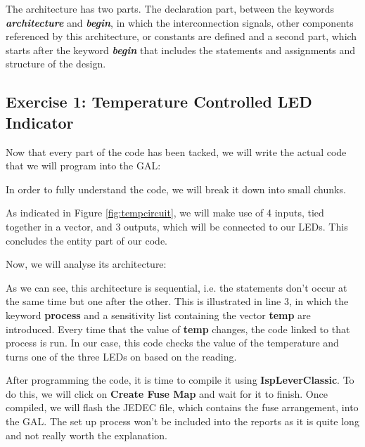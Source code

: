 The architecture has two parts. The declaration part, between the keywords \textbf{\textit{architecture}} and \textbf{\textit{begin}}, in which the interconnection signals, other components referenced by this architecture, or constants are defined and a second part, which starts after the keyword \textbf{\textit{begin}} that includes the statements and assignments and structure of the design.

\clearpage

\subsection{Exercise 1: Temperature Controlled LED Indicator}

Now that every part of the code has been tacked, we will write the actual code that we will program into the GAL:


\newpage

In order to fully understand the code, we will break it down into small chunks.


As indicated in Figure \ref{fig:tempcircuit}, we will make use of 4 inputs, tied together in a vector, and 3 outputs, which will be connected to our LEDs. This concludes the entity part of our code.

Now, we will analyse its architecture:


As we can see, this architecture is sequential, i.e. the statements don't occur at the same time but one after the other. This is illustrated in line 3, in which the keyword \textbf{process} and a sensitivity list containing the vector \textbf{temp} are introduced. Every time that the value of \textbf{temp} changes, the code linked to that process is run. In our case, this code checks the value of the temperature and turns one of the three LEDs on based on the reading.

\newpage

After programming the code, it is time to compile it using \textbf{IspLeverClassic}. To do this, we will click on \textbf{Create Fuse Map} and wait for it to finish. Once compiled, we will flash the JEDEC file, which contains the fuse arrangement, into the GAL. The set up process won't be included into the reports as it is quite long and not really worth the explanation.\medskip


